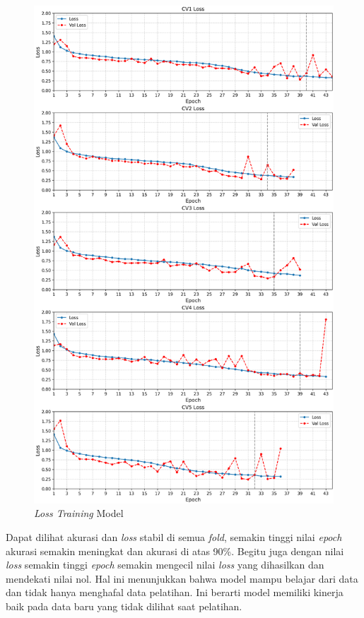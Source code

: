           \begin{figure}[H]
              \centering
              \includegraphics[width=1.0\linewidth]{figures/bab4/loss_plotfix.png}
              \caption{\textit{Loss Training} Model}
              \label{Loss Training Model Terbaik}
          \end{figure}

    Dapat dilihat akurasi dan \textit{loss} stabil di semua \textit{fold}, semakin tinggi nilai \textit{epoch} akurasi semakin meningkat dan akurasi di atas 90\%. Begitu juga dengan nilai \textit{loss} semakin tinggi \textit{epoch} semakin mengecil nilai \textit{loss} yang dihasilkan dan mendekati nilai nol.  Hal ini menunjukkan bahwa model mampu belajar dari data dan tidak hanya menghafal data pelatihan. Ini berarti model memiliki kinerja baik pada data baru yang tidak dilihat saat pelatihan.



